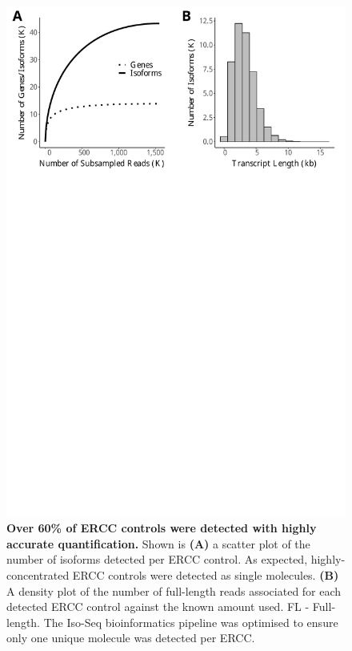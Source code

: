 \begin{figure}[htp]
	\begin{center}
		\includegraphics[page=3,trim={0 26cm 0 0},clip,scale = 0.55]{Figures/IsoSeqWholeTranscriptome.pdf}
	\end{center}
	\captionsetup{width=0.95\textwidth}
	\caption[Detection of ERCC controls from global transcriptome profiling]%
	{\textbf{Over 60\% of ERCC controls were detected with highly accurate quantification.} Shown is \textbf{(A)} a scatter plot of the number of isoforms detected per ERCC control. As expected,  highly-concentrated ERCC controls were detected as single molecules. \textbf{(B)} A density plot of the number of full-length reads associated for each detected ERCC control against the known amount used. FL - Full-length. The Iso-Seq bioinformatics pipeline was optimised to ensure only one unique molecule was detected per ERCC.}
	\label{fig:isoseq_whole_ercc}
\end{figure}

